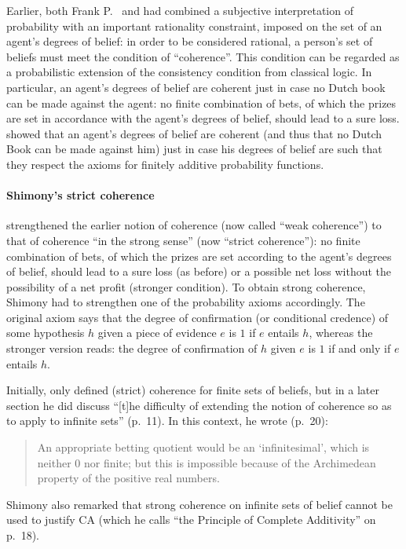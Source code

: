 Earlier, both Frank P.~\citet{Ramsey:1926} and \citet{deFinetti:1937} had combined a subjective interpretation of probability with an important rationality constraint, imposed on the set of an agent's degrees of belief: in order to be considered rational, a person's set of beliefs must meet the condition of ``coherence''. This condition can be regarded as a probabilistic extension of the consistency condition from classical logic.
In particular, an agent's degrees of belief are coherent just in case no Dutch book can be made against the agent: no finite combination of bets, of which the prizes are set in accordance with the agent's degrees of belief, should lead to a sure loss.  showed that an agent's degrees of belief are coherent (and thus that no Dutch Book can be made against him) just in case his degrees of belief are such that they respect the axioms for finitely additive probability functions.

\paragraph{Shimony's strict coherence}
\citet{Shimony:1955} strengthened the earlier notion of coherence (now called ``weak coherence'') to that of coherence ``in the strong sense'' (now ``strict coherence''): no finite combination of bets, of which the prizes are set according to the agent's degrees of belief, should lead to a sure loss (as before) or a possible net loss without the possibility of a net profit (stronger condition).
To obtain strong coherence, Shimony had to strengthen one of the probability axioms accordingly.
The original axiom says that the degree of confirmation (or conditional credence) of some hypothesis $h$ given a piece of evidence $e$ is $1$ if $e$ entails $h$, whereas the stronger version reads: the degree of confirmation of $h$ given $e$ is $1$ if and only if $e$ entails $h$.

Initially, \citet{Shimony:1955} only defined (strict) coherence for finite sets of beliefs, but in a later section he did discuss ``[t]he difficulty of extending the notion of coherence so as to apply to infinite sets'' (p.~11).
In this context, he wrote (p.~20):
\begin{quote}
An appropriate betting quotient would be an `infinitesimal', which is neither $0$ nor finite; but this is impossible because of the Archimedean property of the positive real numbers.
\end{quote}
Shimony also remarked that strong coherence on infinite sets of belief cannot be used to justify CA (which he calls ``the Principle of Complete Additivity'' on p.~18).

